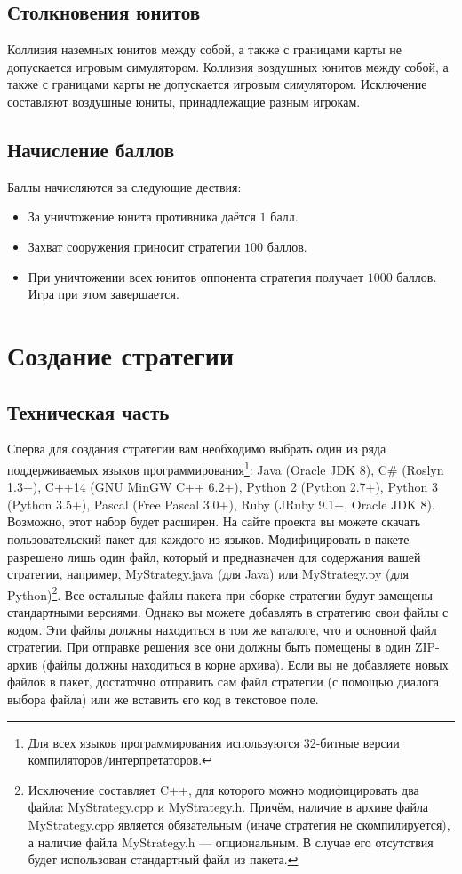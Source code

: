 \section{Столкновения юнитов}

Коллизия наземных юнитов между собой, а также с границами карты не допускается игровым симулятором. Коллизия воздушных юнитов между собой, а
также с границами карты не допускается игровым симулятором. Исключение составляют воздушные юниты, принадлежащие разным игрокам.

\section{Начисление баллов}

Баллы начисляются за следующие дествия:
\begin{itemize}
    \item За уничтожение юнита противника даётся $1$ балл.
    \item Захват сооружения приносит стратегии $100$ баллов.
    \item При уничтожении всех юнитов оппонента стратегия получает $1000$ баллов. Игра при этом завершается.
\end{itemize}

\chapter{Создание стратегии}

\section{Техническая часть}

Сперва для создания стратегии вам необходимо выбрать один из ряда поддерживаемых языков программирования\footnote[4]{Для всех языков
программирования используются 32-битные версии компиляторов/интерпретаторов.}: Java (Oracle JDK 8), C\# (Roslyn 1.3+), C++14 (GNU MinGW C++
6.2+), Python 2 (Python 2.7+), Python 3 (Python 3.5+), Pascal (Free Pascal 3.0+), Ruby (JRuby 9.1+, Oracle JDK 8). Возможно, этот набор
будет расширен. На сайте проекта вы можете скачать пользовательский пакет для каждого из языков. Модифицировать в пакете разрешено лишь один
файл, который и предназначен для содержания вашей стратегии, например, MyStrategy.java (для Java) или MyStrategy.py (для
Python)\footnote[5]{Исключение составляет C++, для которого можно модифицировать два файла: MyStrategy.cpp и MyStrategy.h. Причём, наличие
в архиве файла MyStrategy.cpp является обязательным (иначе стратегия не скомпилируется), а наличие файла MyStrategy.h --- опциональным. В
случае его отсутствия будет использован стандартный файл из пакета.}. Все остальные файлы пакета при сборке стратегии будут замещены
стандартными версиями. Однако вы можете добавлять в стратегию свои файлы с кодом. Эти файлы должны находиться в том же каталоге, что и
основной файл стратегии. При отправке решения все они должны быть помещены в один ZIP-архив (файлы должны находиться в корне архива). Если
вы не добавляете новых файлов в пакет, достаточно отправить сам файл стратегии (с помощью диалога выбора файла) или же вставить его код в
текстовое поле.

